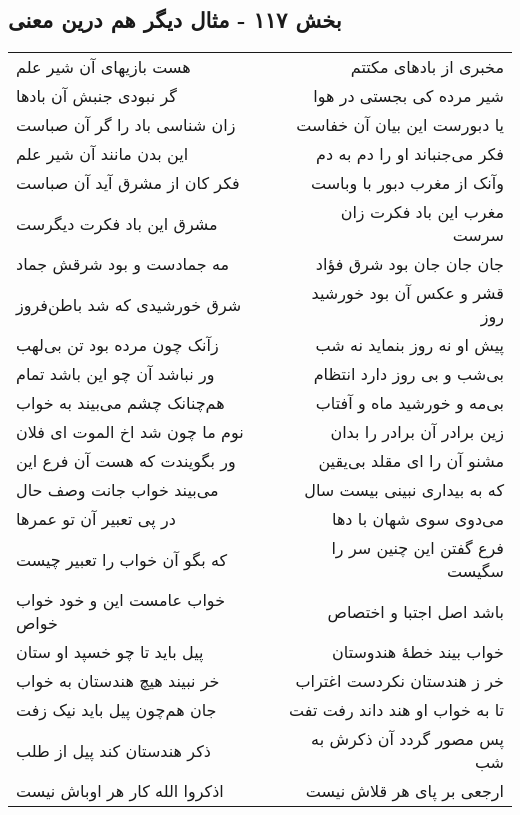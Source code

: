 \begin{center}
\section*{بخش ۱۱۷ - مثال دیگر هم درین معنی}
\label{sec:sh117}
\begin{longtable}{l p{0.5cm} r}
هست بازیهای آن شیر علم
&&
مخبری از بادهای مکتتم
\\
گر نبودی جنبش آن بادها
&&
شیر مرده کی بجستی در هوا
\\
زان شناسی باد را گر آن صباست
&&
یا دبورست این بیان آن خفاست
\\
این بدن مانند آن شیر علم
&&
فکر می‌جنباند او را دم به دم
\\
فکر کان از مشرق آید آن صباست
&&
وآنک از مغرب دبور با وباست
\\
مشرق این باد فکرت دیگرست
&&
مغرب این باد فکرت زان سرست
\\
مه جمادست و بود شرقش جماد
&&
جان جان جان بود شرق فؤاد
\\
شرق خورشیدی که شد باطن‌فروز
&&
قشر و عکس آن بود خورشید روز
\\
زآنک چون مرده بود تن بی‌لهب
&&
پیش او نه روز بنماید نه شب
\\
ور نباشد آن چو این باشد تمام
&&
بی‌شب و بی روز دارد انتظام
\\
هم‌چنانک چشم می‌بیند به خواب
&&
بی‌مه و خورشید ماه و آفتاب
\\
نوم ما چون شد اخ الموت ای فلان
&&
زین برادر آن برادر را بدان
\\
ور بگویندت که هست آن فرع این
&&
مشنو آن را ای مقلد بی‌یقین
\\
می‌بیند خواب جانت وصف حال
&&
که به بیداری نبینی بیست سال
\\
در پی تعبیر آن تو عمرها
&&
می‌دوی سوی شهان با دها
\\
که بگو آن خواب را تعبیر چیست
&&
فرع گفتن این چنین سر را سگیست
\\
خواب عامست این و خود خواب خواص
&&
باشد اصل اجتبا و اختصاص
\\
پیل باید تا چو خسپد او ستان
&&
خواب بیند خطهٔ هندوستان
\\
خر نبیند هیچ هندستان به خواب
&&
خر ز هندستان نکردست اغتراب
\\
جان هم‌چون پیل باید نیک زفت
&&
تا به خواب او هند داند رفت تفت
\\
ذکر هندستان کند پیل از طلب
&&
پس مصور گردد آن ذکرش به شب
\\
اذکروا الله کار هر اوباش نیست
&&
ارجعی بر پای هر قلاش نیست
\\

\end{longtable}
\end{center}
